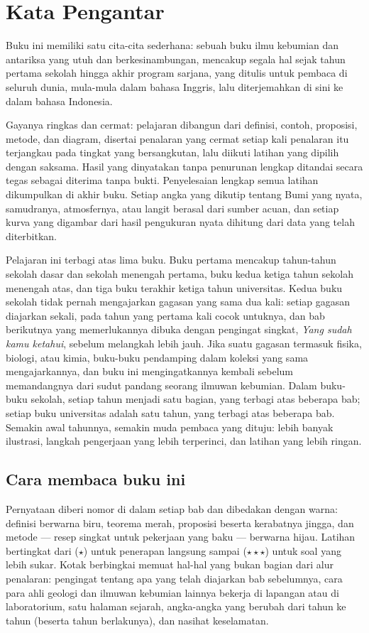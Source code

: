 \chapter{Kata Pengantar}

Buku ini memiliki satu cita-cita sederhana: sebuah buku ilmu kebumian dan
antariksa yang utuh dan berkesinambungan, mencakup segala hal sejak tahun
pertama sekolah hingga akhir program sarjana, yang ditulis untuk pembaca
di seluruh dunia, mula-mula dalam bahasa Inggris, lalu diterjemahkan di
sini ke dalam bahasa Indonesia.

Gayanya ringkas dan cermat: pelajaran dibangun dari definisi, contoh,
proposisi, metode, dan diagram, disertai penalaran yang cermat setiap kali
penalaran itu terjangkau pada tingkat yang bersangkutan, lalu diikuti
latihan yang dipilih dengan saksama. Hasil yang dinyatakan tanpa penurunan
lengkap ditandai secara tegas sebagai diterima tanpa bukti. Penyelesaian
lengkap semua latihan dikumpulkan di akhir buku. Setiap angka yang dikutip
tentang Bumi yang nyata, samudranya, atmosfernya, atau langit berasal dari
sumber acuan, dan setiap kurva yang digambar dari hasil pengukuran nyata
dihitung dari data yang telah diterbitkan.

Pelajaran ini terbagi atas lima buku. Buku pertama mencakup tahun-tahun
sekolah dasar dan sekolah menengah pertama, buku kedua ketiga tahun
sekolah menengah atas, dan tiga buku terakhir ketiga tahun universitas.
Kedua buku sekolah tidak pernah mengajarkan gagasan yang sama dua kali:
setiap gagasan diajarkan sekali, pada tahun yang pertama kali cocok
untuknya, dan bab berikutnya yang memerlukannya dibuka dengan pengingat
singkat, \emph{Yang sudah kamu ketahui}, sebelum melangkah lebih jauh.
Jika suatu gagasan termasuk fisika, biologi, atau kimia, buku-buku
pendamping dalam koleksi yang sama mengajarkannya, dan buku ini
mengingatkannya kembali sebelum memandangnya dari sudut pandang seorang
ilmuwan kebumian. Dalam buku-buku sekolah, setiap tahun menjadi satu
bagian, yang terbagi atas beberapa bab; setiap buku universitas adalah
satu tahun, yang terbagi atas beberapa bab. Semakin awal tahunnya,
semakin muda pembaca yang dituju: lebih banyak ilustrasi, langkah
pengerjaan yang lebih terperinci, dan latihan yang lebih ringan.

\section*{Cara membaca buku ini}

Pernyataan diberi nomor di dalam setiap bab dan dibedakan dengan warna:
definisi berwarna biru, teorema merah, proposisi beserta kerabatnya
jingga, dan metode --- resep singkat untuk pekerjaan yang baku ---
berwarna hijau. Latihan bertingkat dari ($\star$) untuk penerapan langsung
sampai ($\star\star\star$) untuk soal yang lebih sukar. Kotak berbingkai
memuat hal-hal yang bukan bagian dari alur penalaran: pengingat tentang
apa yang telah diajarkan bab sebelumnya, cara para ahli geologi dan
ilmuwan kebumian lainnya bekerja di lapangan atau di laboratorium, satu
halaman sejarah, angka-angka yang berubah dari tahun ke tahun (beserta
tahun berlakunya), dan nasihat keselamatan.


